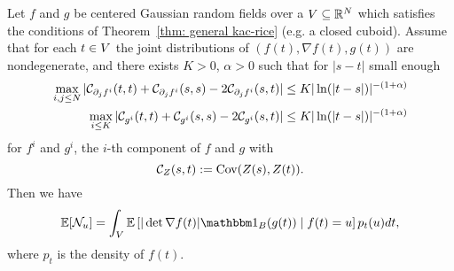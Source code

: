 \begin{corollary}
	\label{cor: gaussian kac-rice}
	Let \(f\) and \(g\) be centered Gaussian random fields over a \(V\subseteq
	\mathbb{R}^N\) which satisfies the conditions of Theorem~\ref{thm: general
	kac-rice} (e.g. a closed cuboid). Assume that for each \(t\in V\) the joint
	distributions of \((f(t), \nabla f(t), g(t))\)
	are nondegenerate, and there exists \(K>0\), \(\alpha>0\) such that
	for \(|s-t|\) small enough
	\begin{align*}
		\max_{i,j\le N}|\mathcal{C}_{\partial_j f^i}(t,t) + \mathcal{C}_{\partial_j f^i}(s,s) - 2\mathcal{C}_{\partial_j f^i}(s,t)|
		&\le K | \ln(|t-s|)|^{-(1+\alpha)}\\
		\max_{i\le K}	|\mathcal{C}_{g^i}(t,t) + \mathcal{C}_{g^i}(s,s) - 2\mathcal{C}_{g^i}(s,t)|
		&\le K | \ln(|t-s|)|^{-(1+\alpha)}
	\end{align*}
	for \(f^i\) and \(g^i\), the \(i\)-th component of \(f\) and \(g\) with
	\[
		\mathcal{C}_{Z}(s,t) := \operatorname{Cov}(Z(s), Z(t)).
	\]
	Then we have
	\begin{equation}
		\E[\level] = \int_\Vol \E\left[
			|\det \nabla f(t)| \ind_B(g(t)) \mid f(t) = u
		\right] p_t(u)dt,
	\end{equation}
	where \(p_t\) is the density of \(f(t)\).	
 \end{corollary}
